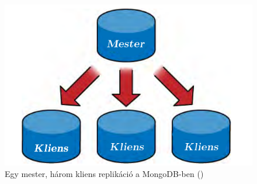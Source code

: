 			\begin{figure}[ht]
				\centering
					\includegraphics[scale=0.5]{pictures/mongo_repl_m_sss.png}%
					\caption[DUMMY]%
					{Egy mester, három kliens replikáció a MongoDB-ben (\cite{scaling_mongodb_repl_m_sss})}
					\label{fig:mongodb_repl_m_sss}
			\end{figure}
		\hfill\\
